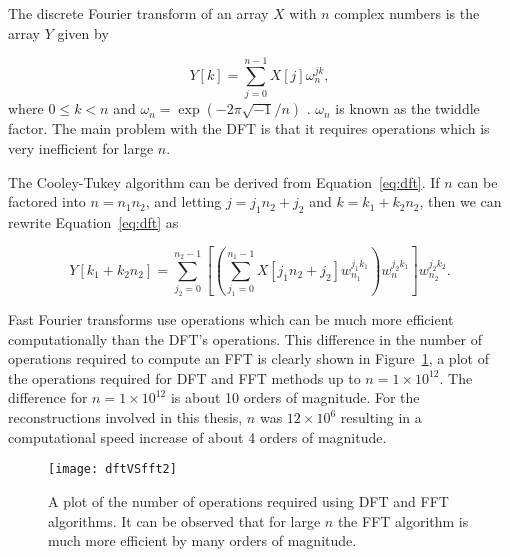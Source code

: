         The discrete Fourier transform of an array $X$ with $n$ complex numbers is the array
        $Y$ given by

        \begin{equation}
            Y[k] = \sum_{j=0}^{n-1}X[j]\omega_n^{jk} ,
            \label{eq:dft}
        \end{equation}
        where $0\le k < n$ and $\omega_n=\exp\left( -2\pi\sqrt{-1}/n \right)$
        \cite{frigo2005design}.
        $\omega_n$ is known as the twiddle factor. The main problem
        with the DFT is that it requires  operations which is very
        inefficient for large $n$.

        The Cooley-Tukey algorithm can be derived from Equation~\ref{eq:dft}. If
        $n$ can be factored into $n=n_1n_2$, and letting $j=j_1n_2+j_2$ and
        $k=k_1+k_2n_2$,
        then we can rewrite
        Equation~\ref{eq:dft} as

        \begin{equation}
            Y[k_1+k_2n_2]=\sum_{j_2=0}^{n_2-1}\left[ \left( \sum_{j_1=0}^{n_1-1}
                X[j_1n_2+j_2]w_{n_1}^{j_1k_1} \right)w_n^{j_2k_1}
            \right]w_{n_2}^{j_2k_2} .
            \end{equation}


            Fast Fourier transforms
            use  operations which can be much more efficient
            computationally than the DFT's  operations. This
            difference in the number of operations required to compute an FFT is clearly shown in
            Figure~\ref{fig:dftVSfft}, a plot of the operations required for
            DFT and FFT methods up to $n=1\times 10^{12}$.
            The difference for $n=1\times 10^{12}$ is about 10 orders of
            magnitude. For the reconstructions involved in this thesis, $n$ was
            $12\times 10^{6}$ resulting in a computational speed increase of about 4
            orders of magnitude.

            \begin{figure}[htbp!]
                \begin{center}
                    \texttt{[image: dftVSfft2]}
                \end{center}
                \caption{A plot of the number of operations required using DFT
                and FFT algorithms. It can be observed that for large $n$ the
            FFT algorithm is much more efficient by many orders of magnitude.}
                \label{fig:dftVSfft}
            \end{figure}


